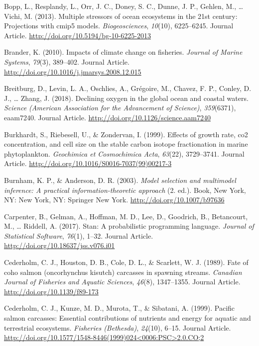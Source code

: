 \documentclass [11pt, proquest] {uwthesis}[2015/03/03]
\begin{document}
\hypertarget{ref-Bopp2013}{}
Bopp, L., Resplandy, L., Orr, J. C., Doney, S. C., Dunne, J. P., Gehlen,
M., \ldots{} Vichi, M. (2013). Multiple stressors of ocean ecosystems in
the 21st century: Projections with cmip5 models. \emph{Biogeosciences},
\emph{10}(10), 6225--6245. Journal Article.
\url{http://doi.org/10.5194/bg-10-6225-2013}

\hypertarget{ref-Brander2010}{}
Brander, K. (2010). Impacts of climate change on fisheries.
\emph{Journal of Marine Systems}, \emph{79}(3), 389--402. Journal
Article. \url{http://doi.org/10.1016/j.jmarsys.2008.12.015}

\hypertarget{ref-Brietburg2018}{}
Breitburg, D., Levin, L. A., Oschlies, A., Grégoire, M., Chavez, F. P.,
Conley, D. J., \ldots{} Zhang, J. (2018). Declining oxygen in the global
ocean and coastal waters. \emph{Science (American Association for the
Advancement of Science)}, \emph{359}(6371), eaam7240. Journal Article.
\url{http://doi.org/10.1126/science.aam7240}

\hypertarget{ref-Burkhardt1999}{}
Burkhardt, S., Riebesell, U., \& Zondervan, I. (1999). Effects of growth
rate, co2 concentration, and cell size on the stable carbon isotope
fractionation in marine phytoplankton. \emph{Geochimica et Cosmochimica
Acta}, \emph{63}(22), 3729--3741. Journal Article.
\url{http://doi.org/10.1016/S0016-7037(99)00217-3}

\hypertarget{ref-Burnham2003}{}
Burnham, K. P., \& Anderson, D. R. (2003). \emph{Model selection and
multimodel inference: A practical information-theoretic approach} (2.
ed.). Book, New York, NY: New York, NY: Springer New York.
\url{http://doi.org/10.1007/b97636}

\hypertarget{ref-Carpenter2017}{}
Carpenter, B., Gelman, A., Hoffman, M. D., Lee, D., Goodrich, B.,
Betancourt, M., \ldots{} Riddell, A. (2017). Stan: A probabilistic
programming language. \emph{Journal of Statistical Software},
\emph{76}(1), 1--32. Journal Article.
\url{http://doi.org/10.18637/jss.v076.i01}

\hypertarget{ref-Cederholm1989}{}
Cederholm, C. J., Houston, D. B., Cole, D. L., \& Scarlett, W. J.
(1989). Fate of coho salmon (oncorhynchus kisutch) carcasses in spawning
streams. \emph{Canadian Journal of Fisheries and Aquatic Sciences},
\emph{46}(8), 1347--1355. Journal Article.
\url{http://doi.org/10.1139/f89-173}

\hypertarget{ref-Cederholm1999}{}
Cederholm, C. J., Kunze, M. D., Murota, T., \& Sibatani, A. (1999).
Pacific salmon carcasses: Essential contributions of nutrients and
energy for aquatic and terrestrial ecosystems. \emph{Fisheries
(Bethesda)}, \emph{24}(10), 6--15. Journal Article.
\href{http://doi.org/10.1577/1548-8446(1999)024\%3C0006:PSC\%3E2.0.CO;2}{http://doi.org/10.1577/1548-8446(1999)024\textless{}0006:PSC\textgreater{}2.0.CO;2}
\end{document}
